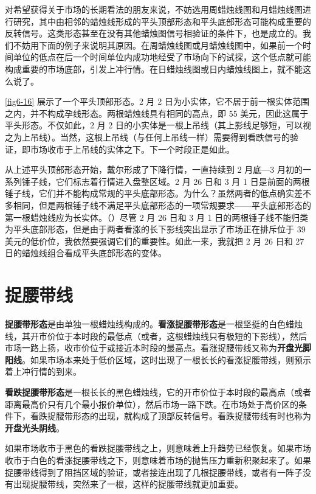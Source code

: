 对希望获得关于市场的长期看法的朋友来说，不妨选用周蜡烛线图和月蜡烛线图进行研究，其中由相邻的蜡烛线形成的平头顶部形态和平头底部形态可能构成重要的反转信号。这类形态甚至在没有其他蜡烛图信号相验证的条件下，也是成立的。我们不妨用下面的例子来说明其原因。在周蜡烛线图或月蜡烛线图中，如果前一个时间单位的低点在后一个时间单位内成功地经受了市场向下的试探，这个低点就可能构成重要的市场底部，引发上冲行情。在日蜡烛线图或日内蜡烛线图上，就不能这么说了。

\autoref{fig6-16} 展示了一个平头顶部形态。2 月 2 日为小实体，它不居于前一根实体范围之内，并不构成孕线形态。两根蜡烛线具有相同的高点，即 55 美元，因此这属于平头形态。不仅如此，2 月 2 日的小实体是一根上吊线（其上影线足够短，可以视之为上吊线）。当然，这根上吊线（与任何上吊线一样）需要得到看跌信号的验证，即市场收市于上吊线的实体之下。下一个时段正是如此。

从上述平头顶部形态开始，戴尔形成了下降行情，一直持续到 2 月底—3 月初的一系列锤子线，它们标志着行情进入盘整区域。2 月 26 日和 3 月 1 日是前面的两根锤子线，它们并不能构成常规的平头底部形态。为什么？虽然两者的低点确实差不多相同，但是两根锤子线不满足平头底部形态的一项常规要求——平头底部形态的第一根蜡烛线应为长实体。（）尽管 2 月 26 日和 3 月 1 日的两根锤子线不能归类为平头底部形态，但是由于两者看涨的长下影线突出显示了市场正在排斥位于 39 美元的低价位，我依然要强调它们的重要性。如此一来，我就把 2 月 26 日和 27 日的蜡烛线组合看成平头底部形态的变体。


\section{捉腰带线}
\textbf{捉腰带形态}是由单独一根蜡烛线构成的。\textbf{看涨捉腰带形态}是一根坚挺的白色蜡烛线，其开市价位于本时段的最低点（或者，这根蜡烛线只有极短的下影线），然后市场一路上扬，收市价位于或接近本时段的最高点。看涨捉腰带线又称为\textbf{开盘光脚阳线}。如果市场本来处于低价区域，这时出现了一根长长的看涨捉腰带线，则预示着上冲行情的到来。

\textbf{看跌捉腰带形态}是一根长长的黑色蜡烛线，它的开市价位于本时段的最高点（或者距离最高价只有几个最小报价单位），然后市场一路下跌。在市场处于高价区的条件下，看跌捉腰带形态的出现，就构成了顶部反转信号。看跌捉腰带线有时也称为\textbf{开盘光头阴线}。

如果市场收市于黑色的看跌捉腰带线之上，则意味着上升趋势已经恢复。如果市场收市于白色的看涨捉腰带线之下，则意味着市场的抛售压力重新积聚起来了。如果捉腰带线得到了阻挡区域的验证，或者接连出现了几根捉腰带线，或者有一阵子没有出现捉腰带线，突然来了一根，这样的捉腰带线就更加重要。

